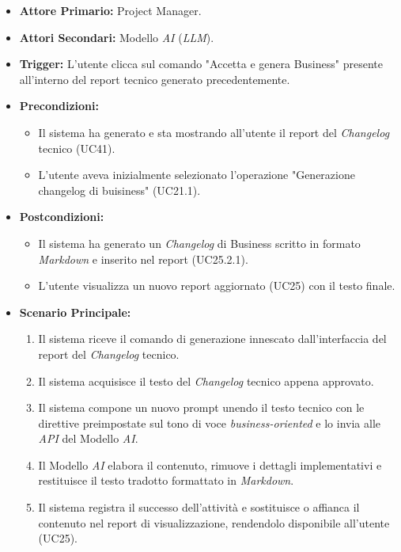 \documentclass[12pt, a4paper]{article}
\begin{document}
\begin{itemize}
    \item \textbf{Attore Primario:} Project Manager.
    \item \textbf{Attori Secondari:} Modello \textit{AI} (\textit{LLM}).
    \item \textbf{Trigger:} L'utente clicca sul comando "Accetta e genera Business" presente all'interno del report tecnico generato precedentemente.
    \item \textbf{Precondizioni:}
    \begin{itemize}
        \item Il sistema ha generato e sta mostrando all'utente il report del \textit{Changelog} tecnico (UC41).
        \item L'utente aveva inizialmente selezionato l'operazione "Generazione changelog di buisiness" (UC21.1).
    \end{itemize}
    \item \textbf{Postcondizioni:}
    \begin{itemize}
        \item Il sistema ha generato un \textit{Changelog} di Business scritto in formato \textit{Markdown} e inserito nel report (UC25.2.1).
        \item L'utente visualizza un nuovo report aggiornato (UC25) con il testo finale.
    \end{itemize}
    \item \textbf{Scenario Principale:}
    \begin{enumerate}
        \item Il sistema riceve il comando di generazione innescato dall'interfaccia del report del \textit{Changelog} tecnico.
        \item Il sistema acquisisce il testo del \textit{Changelog} tecnico appena approvato.
        \item Il sistema compone un nuovo prompt unendo il testo tecnico con le direttive preimpostate sul tono di voce \textit{business-oriented} e lo invia alle \textit{API} del Modello \textit{AI}.
        \item Il Modello \textit{AI} elabora il contenuto, rimuove i dettagli implementativi e restituisce il testo tradotto formattato in \textit{Markdown}.
        \item Il sistema registra il successo dell'attività e sostituisce o affianca il contenuto nel report di visualizzazione, rendendolo disponibile all'utente (UC25).
    \end{enumerate}

\end{itemize}
\end{document}
